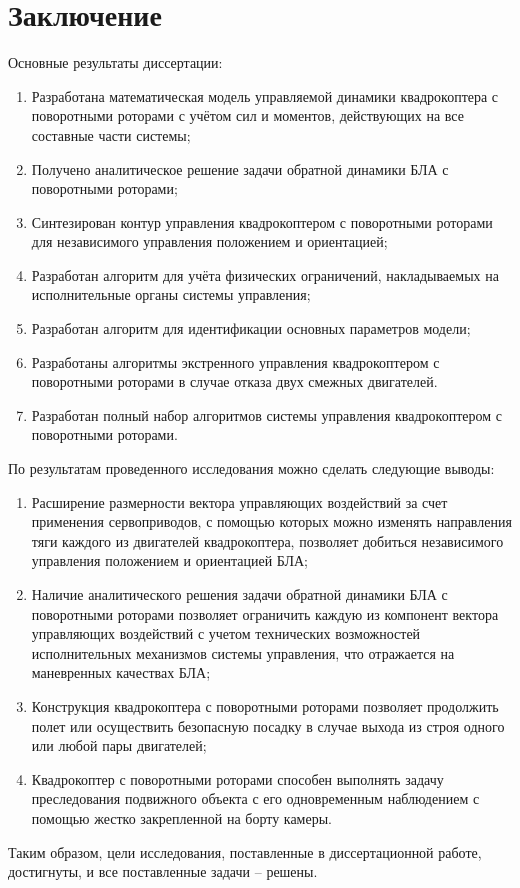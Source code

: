 \chapter{Заключение}
Основные результаты диссертации:
\begin{enumerate}
	\item Разработана математическая модель управляемой динамики квадрокоптера с поворотными роторами с учётом сил и моментов, действующих на все составные части системы;
	\item  Получено аналитическое решение задачи обратной динамики БЛА с поворотными роторами;
	\item Синтезирован контур управления квадрокоптером с поворотными роторами для независимого управления положением и ориентацией; 
	\item Разработан алгоритм для учёта физических ограничений, накладываемых на исполнительные органы системы управления;
	\item Разработан алгоритм для идентификации основных параметров модели;
	\item Разработаны алгоритмы экстренного управления квадрокоптером с поворотными роторами в случае отказа двух смежных двигателей.
	\item Разработан полный набор алгоритмов системы управления квадрокоптером с поворотными роторами.
\end{enumerate}
По результатам проведенного исследования можно сделать следующие
выводы:
\begin{enumerate}
	\item Расширение размерности вектора управляющих воздействий за счет применения сервоприводов, с помощью которых можно изменять направления тяги каждого из двигателей квадрокоптера, позволяет добиться независимого управления положением и ориентацией БЛА;
	\item Наличие аналитического решения задачи обратной динамики БЛА с поворотными роторами  позволяет ограничить каждую из компонент вектора управляющих воздействий с учетом технических возможностей исполнительных механизмов системы управления, что отражается на маневренных качествах БЛА;
	\item Конструкция квадрокоптера с поворотными роторами позволяет продолжить полет или осуществить безопасную посадку в случае выхода из строя одного или любой пары двигателей;
	\item Квадрокоптер с поворотными роторами способен выполнять задачу преследования подвижного объекта с его одновременным наблюдением с помощью жестко закрепленной на борту камеры.
\end{enumerate}
Таким образом, цели исследования, поставленные в диссертационной работе, достигнуты, и все
поставленные задачи – решены.